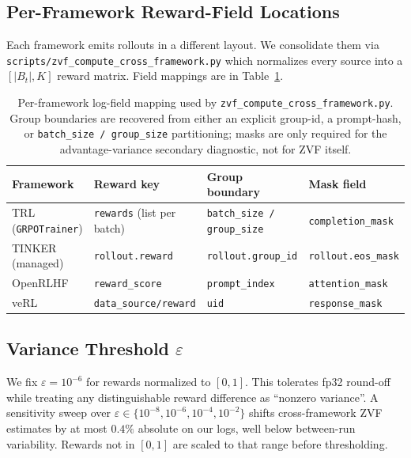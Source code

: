 \documentclass{article}
\begin{document}
\subsection{Per-Framework Reward-Field Locations}

Each framework emits rollouts in a different layout. We consolidate them
via \texttt{scripts/zvf\_compute\_cross\_framework.py} which normalizes
every source into a $[|B_t|, K]$ reward matrix. Field mappings are in
Table~\ref{tab:zvf-parser-fields}.

\begin{table}[ht]
\centering
\small
\begin{tabular}{llll}
\toprule
Framework & Reward key & Group boundary & Mask field \\
\midrule
TRL (\texttt{GRPOTrainer})   & \texttt{rewards} (list per batch) & \texttt{batch\_size / group\_size} & \texttt{completion\_mask} \\
TINKER (managed)             & \texttt{rollout.reward}           & \texttt{rollout.group\_id}         & \texttt{rollout.eos\_mask} \\
OpenRLHF                     & \texttt{reward\_score}            & \texttt{prompt\_index}             & \texttt{attention\_mask}   \\
veRL                         & \texttt{data\_source/reward}      & \texttt{uid}                        & \texttt{response\_mask}   \\
\bottomrule
\end{tabular}
\caption{Per-framework log-field mapping used by
\texttt{zvf\_compute\_cross\_framework.py}. Group boundaries are recovered
from either an explicit group-id, a prompt-hash, or
\texttt{batch\_size / group\_size} partitioning; masks are only required
for the advantage-variance secondary diagnostic, not for ZVF itself.}
\label{tab:zvf-parser-fields}
\end{table}

\subsection{Variance Threshold $\varepsilon$}

We fix $\varepsilon = 10^{-6}$ for rewards normalized to $[0,1]$. This
tolerates fp32 round-off while treating any distinguishable reward
difference as ``nonzero variance''. A sensitivity sweep over
$\varepsilon \in \{10^{-8}, 10^{-6}, 10^{-4}, 10^{-2}\}$ shifts
cross-framework ZVF estimates by at most $0.4\%$ absolute on our logs,
well below between-run variability. Rewards not in $[0,1]$ are scaled to
that range before thresholding.
\end{document}
